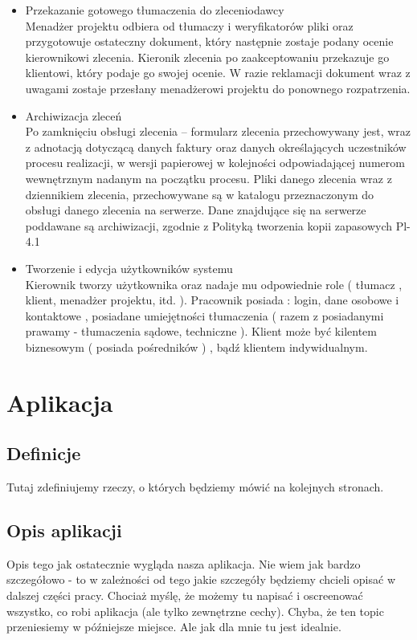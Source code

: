 \documentclass[licencjacka]{pracamgr}
\begin{document}
\begin{itemize}
\item Przekazanie gotowego tłumaczenia do zleceniodawcy\\
Menadżer projektu odbiera od tłumaczy i weryfikatorów pliki oraz przygotowuje ostateczny dokument, który następnie zostaje podany ocenie kierownikowi zlecenia.
Kieronik zlecenia po zaakceptowaniu przekazuje go klientowi, który podaje go swojej ocenie. W razie reklamacji dokument wraz z uwagami zostaje przesłany 
menadżerowi projektu do ponownego rozpatrzenia.

\item Archiwizacja zleceń\\
Po zamknięciu obsługi zlecenia – formularz zlecenia przechowywany jest,
wraz z adnotacją dotyczącą danych faktury oraz danych określających uczestników 
procesu realizacji, w wersji papierowej w kolejności odpowiadającej numerom 
wewnętrznym nadanym na początku procesu.
Pliki danego zlecenia wraz z dziennikiem zlecenia, przechowywane są w 
katalogu przeznaczonym do obsługi danego zlecenia na serwerze.
Dane znajdujące się na serwerze poddawane są archiwizacji, zgodnie z 
Polityką tworzenia kopii zapasowych Pl-4.1

\item Tworzenie i edycja użytkowników systemu\\
Kierownik tworzy użytkownika oraz nadaje mu odpowiednie role ( tłumacz , klient, menadżer projektu, itd. ).
Pracownik posiada : login, dane osobowe i kontaktowe , posiadane umiejętności tłumaczenia ( razem z posiadanymi prawamy - tłumaczenia sądowe, techniczne ).
Klient może być kilentem biznesowym ( posiada pośredników ) , bądź klientem indywidualnym.

\end{itemize}

\chapter{Aplikacja}

\section{Definicje}
Tutaj zdefiniujemy rzeczy, o których będziemy mówić na kolejnych stronach.

\section{Opis aplikacji}
Opis tego jak ostatecznie wygląda nasza aplikacja. Nie wiem jak bardzo szczegółowo - to w zależności od tego jakie szczegóły będziemy chcieli opisać w dalszej części pracy. Chociaż myślę, że możemy tu napisać i oscreenować wszystko, co robi aplikacja (ale tylko zewnętrzne cechy). Chyba, że ten topic przeniesiemy w późniejsze miejsce. Ale jak dla mnie tu jest idealnie.
\end{document}
